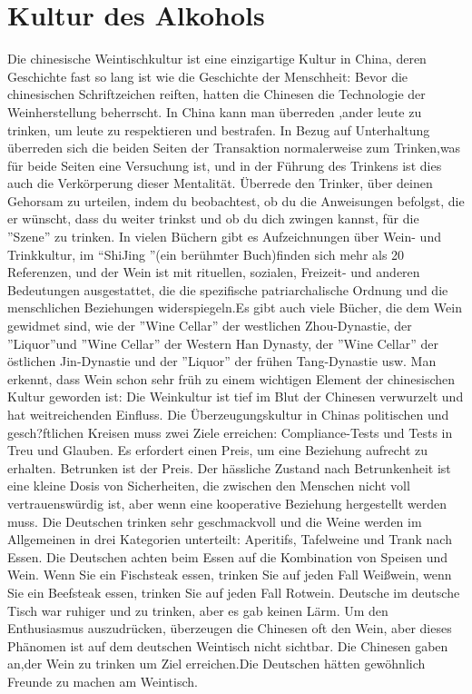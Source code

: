 \section{Kultur des Alkohols}
Die chinesische Weintischkultur ist eine einzigartige Kultur in China, deren Geschichte fast so lang ist wie 
die Geschichte der Menschheit: Bevor die chinesischen Schriftzeichen reiften, hatten die Chinesen die Technologie 
der Weinherstellung beherrscht. In China kann man überreden ,ander leute zu trinken, um leute zu  respektieren und 
bestrafen. In Bezug auf Unterhaltung überreden sich die beiden Seiten der Transaktion normalerweise zum Trinken,was 
für beide Seiten eine Versuchung ist, und in der Führung des Trinkens ist dies auch die Verkörperung dieser Mentalität.
Überrede den Trinker, über deinen Gehorsam zu urteilen, indem du beobachtest, ob du die Anweisungen befolgst, die er
wünscht, dass du weiter trinkst und ob du dich zwingen kannst, für die ''Szene'' zu trinken. In vielen Büchern gibt es 
Aufzeichnungen über Wein- und Trinkkultur, im “ShiJing ”(ein  berühmter Buch)finden sich mehr als 20 Referenzen, und 
der Wein ist mit rituellen, sozialen, Freizeit- und anderen Bedeutungen ausgestattet, die die spezifische patriarchalische
 Ordnung und die menschlichen Beziehungen widerspiegeln.Es gibt auch viele Bücher, die dem Wein gewidmet sind, wie der 
''Wine Cellar'' der westlichen Zhou-Dynastie, der ''Liquor''und ''Wine Cellar'' der Western Han Dynasty,  der ''Wine Cellar'' der  
östlichen Jin-Dynastie und der ''Liquor'' der frühen Tang-Dynastie usw. Man erkennt, dass Wein schon sehr früh zu einem 
wichtigen Element der chinesischen Kultur geworden ist: Die Weinkultur ist tief im Blut der Chinesen verwurzelt und hat 
weitreichenden Einfluss. Die Überzeugungskultur in Chinas politischen und gesch?ftlichen Kreisen muss zwei Ziele erreichen: 
Compliance-Tests und Tests in Treu und Glauben. Es erfordert einen Preis, um eine Beziehung aufrecht zu erhalten. Betrunken 
ist der Preis. Der hässliche Zustand nach Betrunkenheit ist eine kleine Dosis von Sicherheiten, die zwischen den Menschen 
nicht voll vertrauenswürdig ist, aber wenn eine kooperative Beziehung hergestellt werden muss. Die Deutschen trinken sehr  
geschmackvoll und die Weine werden im Allgemeinen in drei Kategorien unterteilt: Aperitifs, Tafelweine und Trank nach Essen. 
Die Deutschen achten beim Essen auf die Kombination von Speisen und Wein. Wenn Sie ein Fischsteak essen, trinken Sie auf jeden 
Fall Wei\ss wein, wenn Sie ein Beefsteak essen, trinken Sie auf jeden Fall Rotwein. Deutsche im  deutsche Tisch war ruhiger und 
zu trinken, aber es gab keinen Lärm. Um den Enthusiasmus auszudrücken, überzeugen die Chinesen oft den Wein, aber dieses Phänomen 
ist auf dem deutschen Weintisch nicht sichtbar. Die Chinesen gaben an,der Wein zu trinken um Ziel erreichen.Die Deutschen hätten 
gewöhnlich Freunde zu machen am Weintisch.

